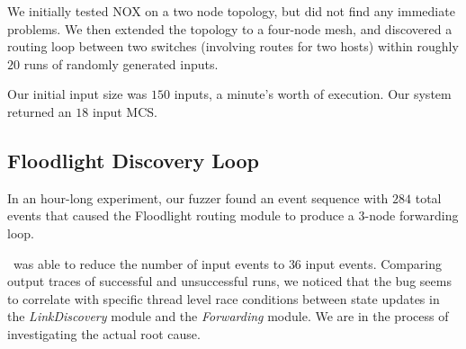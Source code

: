 We initially tested NOX on a two node topology, but did not find any immediate
problems. We then extended the topology to a four-node mesh, and discovered a
routing loop between two switches (involving routes for two hosts) within
roughly $20$ runs of randomly generated inputs.

Our initial input size was $150$ inputs, a minute's worth of execution.
Our system returned an $18$ input MCS.


\subsection{Floodlight Discovery Loop}

In an hour-long experiment,
our fuzzer found an event sequence with $284$ total events
that caused the Floodlight routing module to produce a 3-node forwarding loop.

\Simulator~was able to reduce the number of input events to $36$ input events.
Comparing output traces of successful and
unsuccessful runs, we noticed that the bug seems to correlate with specific
thread level race conditions between state updates in the \emph{LinkDiscovery} module and
the \emph{Forwarding} module. We are in the process of investigating the actual root cause.


